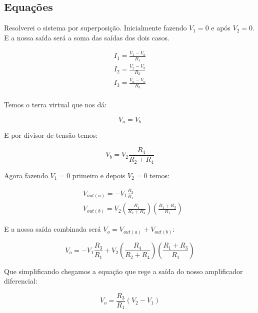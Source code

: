 \documentclass[12pt,twoside, a4paper, twocolumn]{article}
\begin{document}
\subsection{Equações}


Resolverei o sistema por superposição. Inicialmente fazendo $V_1 = 0$ e após $V_2 = 0$. E a nossa saída será a soma das saídas dos dois casos.


\begin{equation}
    \begin{aligned}
        I_1 = \frac{V_1 - V_a}{R_1} \\
        I_2 = \frac{V_2 - V_b}{R_2} \\
        I_3 = \frac{V_a - V_o}{R_3} \\
    \end{aligned}
\end{equation}


Temos o terra virtual que nos dá:


\begin{equation}
    V_a = V_b
\end{equation}


E por divisor de tensão temos:


\begin{equation}
    V_b = V_2 \frac{R_4}{R_2 + R_4}
\end{equation}


Agora fazendo $V_1 = 0$ primeiro e depois $V_2 = 0$ temos:


\begin{equation}
    \begin{aligned}
         & V_{out(a)} = -V_1 \frac{R_3}{R_1}                                                          \\
         & V_{out(b)} = V_2 \left( \frac{R_4}{R_2 + R_4} \right) \left( \frac{R_1 + R_3}{R_1} \right)
    \end{aligned}
\end{equation}


E a nossa saída combinada será $V_o = V_{out(a)} + V_{out(b)}$:


\begin{equation}
    V_o = -V_1 \frac{R_3}{R_1} + V_2 \left( \frac{R_4}{R_2 + R_4} \right) \left( \frac{R_1 + R_3}{R_1} \right)
\end{equation}


Que simplificando chegamos a equação que rege a saída do nosso amplificador diferencial:


\begin{equation}
    V_o = \frac{R_3}{R_1} \left( V_2 - V_1 \right)
\end{equation}
\end{document}
